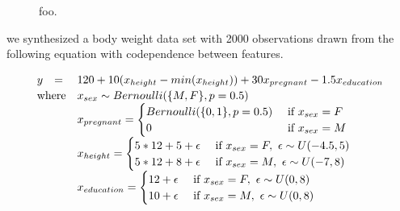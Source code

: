 \documentclass{article}
\begin{document}
\begin{figure}[htbp]
\begin{center}
\caption{\small foo.}
\label{fig:pregnant}
\end{center}
\end{figure}

we synthesized a body weight data set with 2000 observations drawn from the following equation with codependence between features.

\begin{equation}\label{eq:weight}
\begin{array}{rll}
y & = &120 + 10(x_{height} - min(x_{height})) + 30x_{pregnant} - 1.5x_{education}\\
\vspace{-10pt}\\
\multicolumn{2}{r}{\text{where}} & x_{sex} \sim Bernoulli(\{M,F\}, p=0.5)\\
                    & & x_{pregnant} = \begin{cases}
                                               Bernoulli(\{0,1\},p=0.5) & \text{ if } x_{sex} = F\\
                                               0 & \text{ if } x_{sex}=M\\
                                               \end{cases}\\
                    & & x_{height} = \begin{cases}
                                               5*12+5+ \epsilon & \text{ if } x_{sex}=F,~ \epsilon \sim U(-4.5,5)\\	
                                               5*12+8 + \epsilon & \text{ if } x_{sex}=M,~ \epsilon \sim U(-7,8)\\
                                               \end{cases}\\
                    & & x_{education} = \begin{cases}
                                               12 + \epsilon & \text{ if } x_{sex}=F,~ \epsilon \sim U(0,8)\\	
                                               10 + \epsilon & \text{ if } x_{sex}=M,~ \epsilon \sim U(0,8)\\
                                               \end{cases}
\end{array}
\end{equation}
\end{document}
